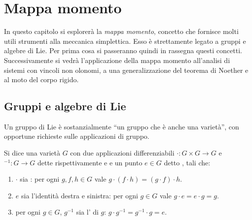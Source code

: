 \chapter{Mappa momento}
In questo capitolo si esplorerà la \emph{mappa momento}, concetto che fornisce molti utili strumenti alla meccanica simplettica. Esso è strettamente legato a gruppi e algebre di Lie. Per prima cosa si passeranno quindi in rassegna questi concetti. Successivamente si vedrà l'applicazione della mappa momento all'analisi di sistemi con vincoli non olonomi, a una generalizzazione del teorema di Noether e al moto del corpo rigido.

\section{Gruppi e algebre di Lie}
Un gruppo di Lie è sostanzialmente \textquotedblleft un gruppo che è anche una varietà\textquotedblright, con opportune richieste sulle applicazioni di gruppo.
\begin{definition}
  Si dice  una varietà $G$ con due applicazioni differenziabili $\cdot: G \times G \to G$ e ${}^{-1}: G\to G$ dette rispettivamente  e  e un punto $e \in G$ detto , tali che:
  \begin{enumerate}
    \item $\cdot $ sia : per ogni $g,f,h \in G$ vale $g\cdot (f\cdot h) = (g\cdot f) \cdot h$.
    \item $e$ sia l'identità destra e sinistra: per ogni $g \in G$ vale $g \cdot e = e \cdot g = g$.
    \item per ogni $g \in G$, $g^{-1}$ sia l' di $g$: $g \cdot g^{-1} = g^{-1}\cdot g = e$.
  \end{enumerate}
\end{definition}

